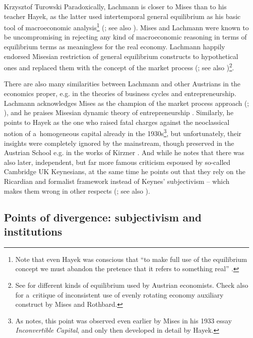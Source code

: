 \begin{artengenv}{Krzysztof Turowski}
Paradoxically, Lachmann is closer to Mises than to his teacher Hayek, as the latter used intertemporal general equilibrium as his basic tool of macroeconomic analysis\footnote{Note that even Hayek was conscious that ``to make full use of the equilibrium concept we must abandon the pretence that it refers to something real'' \parencite[23]{hayek-pure}.} (\cite[190]{lachmann-hayek}; see also \cite{lachmann-hayek-sraffa}).
Mises and Lachmann were known to be uncompromising in rejecting any kind of macroeconomic reasoning in terms of equilibrium terms as meaningless for the real economy.
Lachmann happily endorsed Misesian restriction of general equilibrium constructs to hypothetical ones and replaced them with the concept of the market process (\cite[183]{lachmann-mises-process}; see also \cite[230--231]{mises-planning})\footnote{See \textcite{salerno-equilibrium} for different kinds of equilibrium used by Austrian economists. Check also \textcite{cowen-ere} for a~critique of inconsistent use of evenly rotating economy auxiliary construct by Mises and Rothbard.}.

There are also many similarities between Lachmann and other Austrians in the economics proper, e.g. in the theories of business cycles and entrepreneurship.
Lachmann acknowledges Mises as the champion of the market process approach (\cite[182--183]{lachmann-mises-process}; \citeyear[60]{lachmann-kaleidic}), and he praises Misesian dynamic theory of entrepreneurship \parencite[102]{lachmann-ha}. Similarly, he points to Hayek as the one who raised fatal charges against the neoclassical notion of a~homogeneous capital already in the 1930s\footnote{As \textcite[lxii-lxiii]{hulsmann} notes, this point was observed even earlier by Mises in his 1933 essay \emph{Inconvertible Capital}, and only then developed in detail by Hayek.}, but unfortunately, their insights were completely ignored by the mainstream, though preserved in the Austrian School e.g. in the works of Kirzner \parencite[195--198]{lachmann-hayek}.
And while he notes that there was also later, independent, but far more famous criticism espoused by so-called Cambridge UK Keynesians, at the same time he points out that they rely on the Ricardian and formalist framework instead of Keynes' subjectivism -- which makes them wrong in other respects (\cite[21, 51--52]{lachmann1973macro}; see also \cite[33]{lachmann-crisis}).

\subsection{Points of divergence: subjectivism and institutions}



\end{artengenv}
